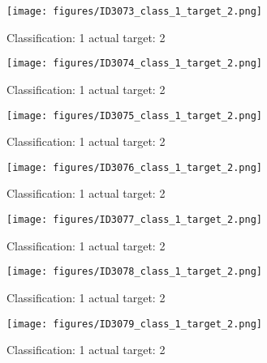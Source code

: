 \begin{figure}[h!]
\begin{center}
\texttt{[image: figures/ID3073\_class\_1\_target\_2.png]}
\end{center}
\caption{ Classification: 1 actual target: 2}
\label{fig:ID3073_class_1_target_2}
\end{figure}
\begin{figure}[h!]
\begin{center}
\texttt{[image: figures/ID3074\_class\_1\_target\_2.png]}
\end{center}
\caption{ Classification: 1 actual target: 2}
\label{fig:ID3074_class_1_target_2}
\end{figure}
\begin{figure}[h!]
\begin{center}
\texttt{[image: figures/ID3075\_class\_1\_target\_2.png]}
\end{center}
\caption{ Classification: 1 actual target: 2}
\label{fig:ID3075_class_1_target_2}
\end{figure}
\begin{figure}[h!]
\begin{center}
\texttt{[image: figures/ID3076\_class\_1\_target\_2.png]}
\end{center}
\caption{ Classification: 1 actual target: 2}
\label{fig:ID3076_class_1_target_2}
\end{figure}
\begin{figure}[h!]
\begin{center}
\texttt{[image: figures/ID3077\_class\_1\_target\_2.png]}
\end{center}
\caption{ Classification: 1 actual target: 2}
\label{fig:ID3077_class_1_target_2}
\end{figure}
\begin{figure}[h!]
\begin{center}
\texttt{[image: figures/ID3078\_class\_1\_target\_2.png]}
\end{center}
\caption{ Classification: 1 actual target: 2}
\label{fig:ID3078_class_1_target_2}
\end{figure}
\begin{figure}[h!]
\begin{center}
\texttt{[image: figures/ID3079\_class\_1\_target\_2.png]}
\end{center}
\caption{ Classification: 1 actual target: 2}
\label{fig:ID3079_class_1_target_2}
\end{figure}
